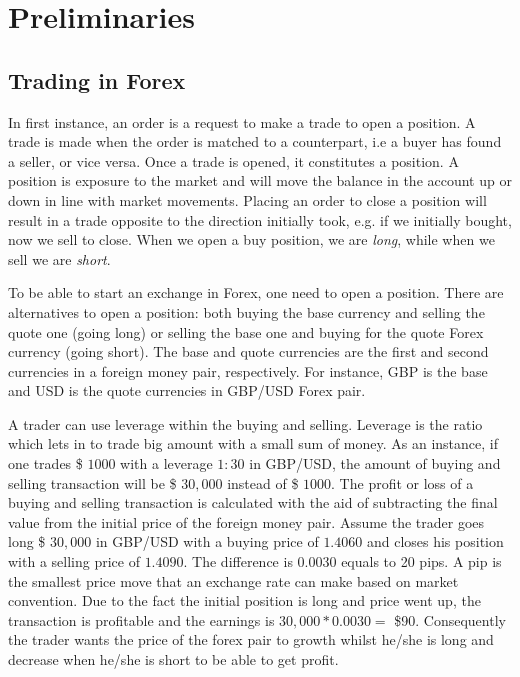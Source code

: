 \section{Preliminaries}
\label{sec:3}

\subsection{Trading in Forex}
In first instance, an order is a request to make a trade to open a position.
A trade is made when the order is matched to a counterpart, i.e a buyer has found a seller, or vice versa.
Once a trade is opened, it constitutes a position. A position is exposure to the market and will move the balance in the account up or down in line with market movements. Placing an order to close a position will result in a trade opposite to the direction initially took, e.g. if we initially bought, now we sell to close. When we open a buy position, we are \textit{long}, while when we sell we are \textit{short}.

To be able to start an exchange in Forex, one need to open a position. There are alternatives to open a position: both buying the base currency and selling the quote one (going long) or selling the base one and buying for the quote Forex currency (going short). The base and quote currencies are the first and second currencies in a foreign money pair, respectively. For instance, GBP is the base and USD is the quote currencies in GBP/USD Forex pair.

A trader can use leverage within the buying and selling. Leverage is the ratio which lets in to trade big amount with a small sum of money. As an instance, if one trades \$ $1000$ with a leverage $1:30$ in GBP/USD, the amount of buying and selling transaction will be \$ $30,000$ instead of \$ $1000$.
The profit or loss of a buying and selling transaction is calculated with the aid of subtracting the final value from the initial price of the foreign money pair. Assume the trader goes long  \$ $30,000$ in GBP/USD with a buying price of $1.4060$ and closes his position with a selling price of $1.4090$. The difference is $0.0030$ equals to 20 pips. A pip is the smallest price move that an exchange rate can make based on market convention. Due to the fact the initial position is long and price went up, the transaction is profitable and the earnings is $30,000 * 0.0030 =$ \$90. Consequently the trader wants the price of the forex pair to growth whilst he/she is long and decrease when he/she is short to be able to get profit.


